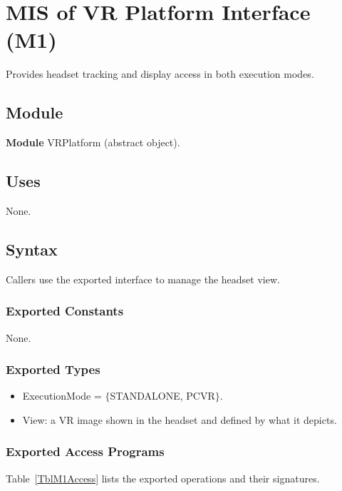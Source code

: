 \documentclass[12pt, titlepage]{article}
\begin{document}
\newpage

\section{MIS of VR Platform Interface (M1)} \label{sec:M1}

Provides headset tracking and display access in both execution modes.

\subsection{Module}

\textbf{Module} VRPlatform (abstract object).

\subsection{Uses}

None.

\subsection{Syntax}

Callers use the exported interface to manage the headset view.

\subsubsection{Exported Constants}

None.

\subsubsection{Exported Types}

\begin{itemize}
\item ExecutionMode = $\{$STANDALONE, PCVR$\}$.
\item View: a VR image shown in the headset and defined by
  what it depicts.
\end{itemize}

\subsubsection{Exported Access Programs}

Table~\ref{TblM1Access} lists the exported operations and their signatures.
\end{document}
